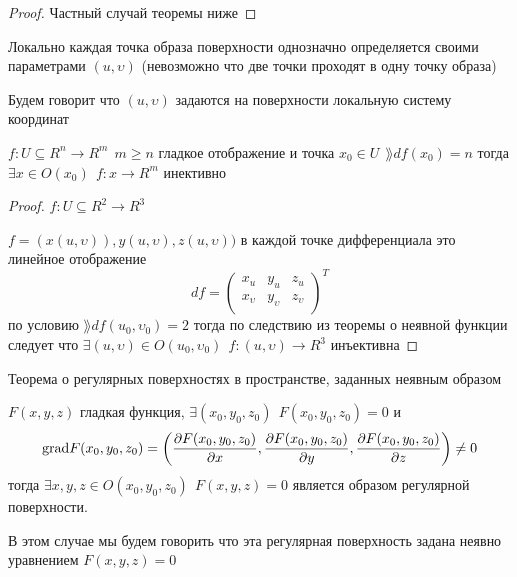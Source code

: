 \begin{proof}
  Частный случай теоремы ниже
\end{proof}

\begin{block}[Следствие]
  Локально каждая точка образа поверхности однозначно определяется своими
  параметрами $(u, \upsilon)$ (невозможно что две точки проходят в одну точку
  образа)

  Будем говорит что $(u, \upsilon)$ задаются на поверхности локальную систему
  координат
\end{block}

\begin{theorem}
  $f: U \subseteq R^n \to R^m ~~ m \ge n$ гладкое отображение и точка
  $x_0 \in U ~~ \rang df(x_0) = n$ тогда $\exists x \in O(x_0) ~~
  f: x \to R^m$ инективно
\end{theorem}

\begin{proof}
  $f: U \subseteq R^2 \to R^3$

  $f = (x(u, \upsilon)), y(u, \upsilon), z(u, \upsilon))$ в каждой точке
  дифференциала это линейное отображение
  $$
  df =
  \left(
  \begin{array}{ccc}
    x_u & y_u & z_u \\
    x_{\upsilon} & y_{\upsilon} & z_{\upsilon} \\
  \end{array}
  \right)^T
  $$
  по условию $\rang df(u_0, \upsilon_0) = 2$ тогда по следствию из теоремы о
  неявной функции следует что $\exists (u, \upsilon) \in O(u_0, \upsilon_0) ~~
  f: (u, \upsilon) \to R^3$ инъективна
\end{proof}

\begin{title}[\Large]
  Теорема о регулярных поверхностях в пространстве, заданных неявным образом
\end{title}

\begin{theorem}
  $F(x,y,z)$ гладкая функция, $\exists (x_0, y_0, z_0) ~~ F(x_0, y_0, z_0) = 0$
  и
  $$
  \mathrm{grad} F(x_0, y_0, z_0) = \left(
  \frac{\partial F(x_0, y_0, z_0)}{\partial x},
  \frac{\partial F(x_0, y_0, z_0)}{\partial y},
  \frac{\partial F(x_0, y_0, z_0)}{\partial z}
  \right) \not= 0
  $$
  тогда $\exists x,y,z \in O(x_0, y_0, z_0) ~~ F(x, y, z) = 0$ является образом
  регулярной поверхности.

  В этом случае мы будем говорить что эта регулярная поверхность задана
  неявно уравнением $F(x, y, z) = 0$
\end{theorem}


